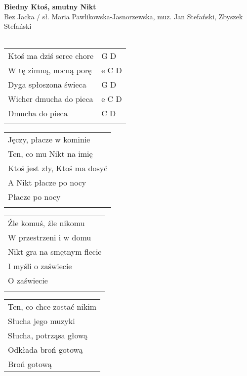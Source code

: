 \documentclass[a5paper]{article}
\begin{document}


\noindent
\fontsize{12pt}{15pt}\selectfont
\textbf{Biedny Ktoś, smutny Nikt} \\
\fontsize{8pt}{10pt}\selectfont
Bez Jacka / sł. Maria Pawlikowska-Jasnorzewska, muz. Jan Stefański, Zbyszek Stefański \\ \\
\fontsize{10pt}{12pt}\selectfont
{}
\begin{tabular}{@{}p{7cm}p{3cm}@{}}
\noindent
Ktoś ma dziś serce chore & G D\\
W tę zimną, nocną porę & e C D \\
Dyga spłoszona świeca & G D \\
Wicher dmucha do pieca & e C D \\
Dmucha do pieca & C D \\ \\
\end{tabular}

\noindent
\begin{tabular}{@{}p{9.5cm}@{}}
Jęczy, płacze w kominie \\
Ten, co mu Nikt na imię \\
Ktoś jest zły, Ktoś ma dosyć \\
A Nikt płacze po nocy \\
Płacze po nocy \\ \\
\end{tabular}

\noindent
\begin{tabular}{@{}p{9.5cm}@{}}
Źle komuś, źle nikomu \\
W przestrzeni i w domu \\
Nikt gra na smętnym flecie \\
I myśli o zaświecie \\ 
O zaświecie \\ \\
\end{tabular}

\noindent
\begin{tabular}{@{}p{9.5cm}@{}}
Ten, co chce zostać nikim \\ 
Słucha jego muzyki \\
Słucha, potrząsa głową \\
Odkłada broń gotową \\
Broń gotową
\end{tabular}
\end{document}
